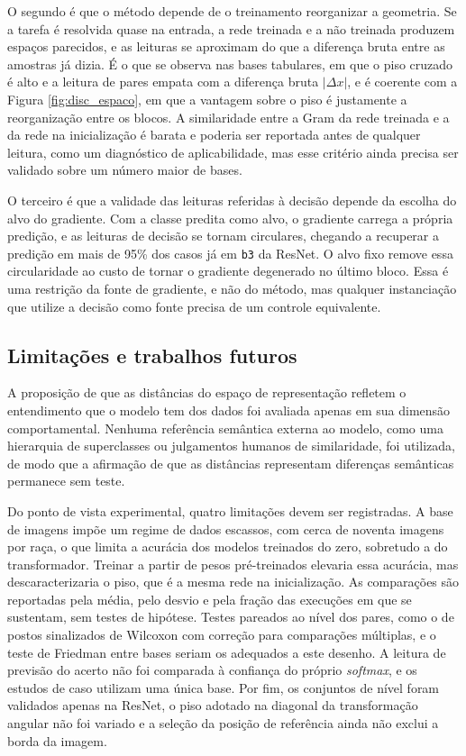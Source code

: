 O segundo é que o método depende de o treinamento reorganizar a geometria. Se a tarefa é resolvida quase na entrada, a rede treinada e a não treinada produzem espaços parecidos, e as leituras se aproximam do que a diferença bruta entre as amostras já dizia. É o que se observa nas bases tabulares, em que o piso cruzado é alto e a leitura de pares empata com a diferença bruta $|\Delta x|$, e é coerente com a Figura \ref{fig:disc_espaco}, em que a vantagem sobre o piso é justamente a reorganização entre os blocos. A similaridade entre a Gram da rede treinada e a da rede na inicialização é barata e poderia ser reportada antes de qualquer leitura, como um diagnóstico de aplicabilidade, mas esse critério ainda precisa ser validado sobre um número maior de bases.

O terceiro é que a validade das leituras referidas à decisão depende da escolha do alvo do gradiente. Com a classe predita como alvo, o gradiente carrega a própria predição, e as leituras de decisão se tornam circulares, chegando a recuperar a predição em mais de 95\% dos casos já em \texttt{b3} da ResNet. O alvo fixo remove essa circularidade ao custo de tornar o gradiente degenerado no último bloco. Essa é uma restrição da fonte de gradiente, e não do método, mas qualquer instanciação que utilize a decisão como fonte precisa de um controle equivalente.

\subsection{Limitações e trabalhos futuros}\label{subsec:res_limitacoes}

A proposição de que as distâncias do espaço de representação refletem o entendimento que o modelo tem dos dados foi avaliada apenas em sua dimensão comportamental. Nenhuma referência semântica externa ao modelo, como uma hierarquia de superclasses ou julgamentos humanos de similaridade, foi utilizada, de modo que a afirmação de que as distâncias representam diferenças semânticas permanece sem teste.

Do ponto de vista experimental, quatro limitações devem ser registradas. A base de imagens impõe um regime de dados escassos, com cerca de noventa imagens por raça, o que limita a acurácia dos modelos treinados do zero, sobretudo a do transformador. Treinar a partir de pesos pré-treinados elevaria essa acurácia, mas descaracterizaria o piso, que é a mesma rede na inicialização. As comparações são reportadas pela média, pelo desvio e pela fração das execuções em que se sustentam, sem testes de hipótese. Testes pareados ao nível dos pares, como o de postos sinalizados de Wilcoxon com correção para comparações múltiplas, e o teste de Friedman entre bases seriam os adequados a este desenho. A leitura de previsão do acerto não foi comparada à confiança do próprio \textit{softmax}, e os estudos de caso utilizam uma única base. Por fim, os conjuntos de nível foram validados apenas na ResNet, o piso adotado na diagonal da transformação angular não foi variado e a seleção da posição de referência ainda não exclui a borda da imagem.

